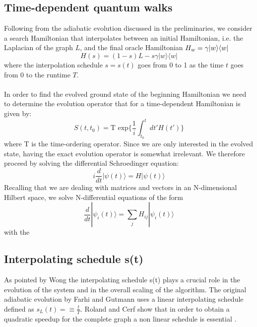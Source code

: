     \subsection{Time-dependent quantum walks}
        Following from the adiabatic evolution discussed in the preliminaries, we consider a search Hamiltonian that interpolates between an initial Hamiltonian, i.e. the Laplacian of the graph $L$, and the final oracle Hamiltonian $H_w=\gamma{|{w}\rangle}{\langle{w}|}$
          \begin{equation}
            H(s) = (1-s)L - s\gamma|w\rangle\langle w|
          \end{equation}
        where the interpolation schedule $s=s(t)$ goes from 0 to 1 as the time $t$ goes from 0 to the runtime $T$. \\ \\In order to find the evolved ground state of the beginning Hamiltonian we need to determine the evolution operator that for a time-dependent Hamiltonian is given by:
        \begin{equation}
          S(t,t_0) = \mbox{T } \mbox{exp}\Big\{ \frac{1}{i}\int_{t_0}^{t} dt' H(t')\Big\}
        \end{equation}
        where T is the time-ordering operator. Since we are only interested in the evolved state, having the exact evolution operator is somewhat irrelevant.  We therefore proceed by solving the differential Schroedinger equation:
        \begin{equation}
          i\frac{d}{dt}|\psi(t)\rangle = H |\psi(t)\rangle
        \end{equation}
        Recalling that we are dealing with matrices and vectors in an N-dimensional Hilbert space, we solve N-differential equations of the form
        \begin{equation}
        \frac{d}{dt}|\psi_i(t)\rangle = \sum_jH_{ij}|\psi_i(t)\rangle
        \end{equation}
        with the \\

    \clearpage
    \subsection{Interpolating schedule s(t)}\label{subsec:interpolating schedules}
        As pointed by Wong the interpolating schedule s(t) plays a crucial role in the evolution of the system and in the overall scaling of the algorithm.
        The original adiabatic evolution by Farhi and Gutmann \cite{Farhi2000} uses a linear interpolating schedule defined as $s_L(t) =\equiv \frac{t}{T}$. Roland and Cerf show that in order to obtain a quadratic speedup for the complete graph a non linear schedule is essential \cite{Roland2002}\cite{Morley2018}.

